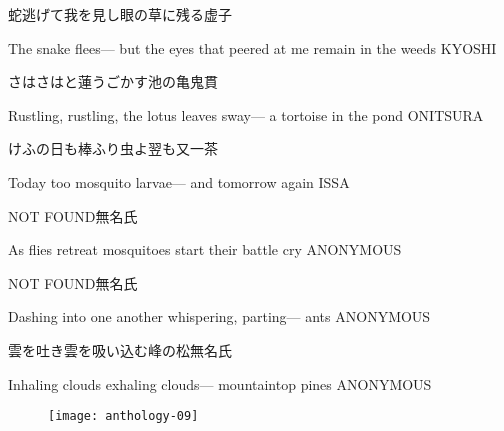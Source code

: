 \begin{haiku}
    {\FH 蛇逃げて我を見し眼の草に残る}\hfill{\FH 虚子}

    \vin{} The snake flees---
    \vin{} \vin{} but the eyes that peered at me
    \vin{} \vin{} \vin{} remain in the weeds \hspace{\fill} KYOSHI
\end{haiku}

\begin{haiku}
    {\FH さはさはと蓮うごかす池の亀}\hfill{\FH 鬼貫}

    \vin{} Rustling, rustling,
    \vin{} \vin{} the lotus leaves sway---
    \vin{} \vin{} \vin{} a tortoise in the pond \hspace{\fill} ONITSURA
\end{haiku}

\begin{haiku}
    {\FH けふの日も棒ふり虫よ翌も又}\hfill{\FH 一茶}

    \vin{} Today too
    \vin{} \vin{} mosquito larvae---
    \vin{} \vin{} \vin{} and tomorrow again \hspace{\fill} ISSA
\end{haiku}

\begin{haiku}
    {NOT FOUND}\hfill{\FH 無名氏}

    \vin{} As flies retreat
    \vin{} \vin{} mosquitoes start
    \vin{} \vin{} \vin{} their battle cry \hspace{\fill} ANONYMOUS
\end{haiku}

\begin{haiku}
    {NOT FOUND}\hfill{\FH 無名氏}

    \vin{} Dashing into one another
    \vin{} \vin{} whispering, parting---
    \vin{} \vin{} \vin{} ants \hspace{\fill} ANONYMOUS
\end{haiku}

\begin{haiku}
    {雲を吐き雲を吸い込む峰の松}\hfill{\FH 無名氏}

    \vin{} Inhaling clouds
    \vin{} \vin{} exhaling clouds---
    \vin{} \vin{} \vin{} mountaintop pines \hspace{\fill} ANONYMOUS
\end{haiku}

\begin{figure}
    \texttt{[image: anthology-09]}
\end{figure}

